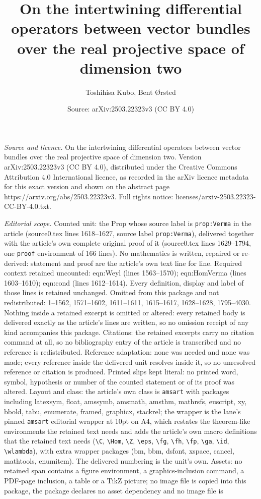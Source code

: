 \documentclass[10pt,a4paper]{amsart}
\title[On the intertwining differential operators between vector bu]{On the intertwining differential operators between vector bundles over the real projective space of dimension two}
\author{Toshihisa Kubo, Bent {\O}rsted}
\date{Source: arXiv:2503.22323v3 (CC BY 4.0)}
\begin{document}
\maketitle

\noindent\emph{Source and licence.} On the intertwining differential operators between vector bundles over the real projective space of dimension two. Version arXiv:2503.22323v3 (CC BY 4.0), distributed under the Creative Commons Attribution 4.0 International licence, as recorded in the arXiv licence metadata for this exact version and shown on the abstract page https://arxiv.org/abs/2503.22323v3. Full rights notice: licenses/arxiv-2503.22323-CC-BY-4.0.txt.\par\smallskip

\noindent\textit{Editorial scope.} Counted unit: the Prop whose source label is \texttt{prop:Verma} in the article (source0.tex lines 1618--1627, source label \texttt{prop:Verma}), delivered together with the article's own complete original proof of it (source0.tex lines 1629--1794, one \texttt{proof} environment of 166 lines). No mathematics is written, repaired or re-derived: statement and proof are the article's own text line for line. Required context retained uncounted: eqn:Weyl (lines 1563--1570); eqn:HomVerma (lines 1603--1610); eqn:cond (lines 1612--1614). Every definition, display and label of those lines is retained unchanged. Omitted from this package and not redistributed: 1--1562, 1571--1602, 1611--1611, 1615--1617, 1628--1628, 1795--4030. Nothing inside a retained excerpt is omitted or altered: every retained body is delivered exactly as the article's lines are written, so no omission receipt of any kind accompanies this package. Citations: the retained excerpts carry no citation command at all, so no bibliography entry of the article is transcribed and no reference is redistributed. Reference adaptation: none was needed and none was made; every reference inside the delivered unit resolves inside it, so no unresolved reference or citation is produced. Printed slips kept literal: no printed word, symbol, hypothesis or number of the counted statement or of its proof was altered. Layout and class: the article's own class is \texttt{amsart} with packages including latexsym, float, amssymb, amsmath, amsthm, mathrsfs, euscript, xy, bbold, tabu, enumerate, framed, graphicx, stackrel; the wrapper is the lane's pinned \texttt{amsart} editorial wrapper at 10pt on A4, which restates the theorem-like environments the retained text needs and adds the article's own macro definitions that the retained text needs (\texttt{\textbackslash C}, \texttt{\textbackslash Hom}, \texttt{\textbackslash Z}, \texttt{\textbackslash eps}, \texttt{\textbackslash fg}, \texttt{\textbackslash fh}, \texttt{\textbackslash fp}, \texttt{\textbackslash ga}, \texttt{\textbackslash id}, \texttt{\textbackslash wlambda}), with extra wrapper packages (bm, bbm, dsfont, xspace, cancel, mathtools, enumitem). The delivered numbering is the unit's own. Assets: no retained span contains a figure environment, a graphics-inclusion command, a PDF-page inclusion, a table or a TikZ picture; no image file is copied into this package, the package declares no asset dependency and no image file is 
\end{document}
